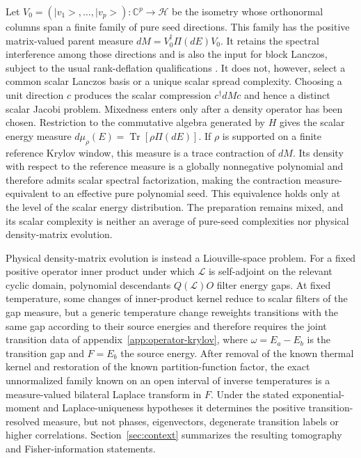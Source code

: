\documentclass[a4paper,11pt]{article}
\def\ket#1{|#1>}%
\def\dd{d}%
\theoremstyle{definition}
\theoremstyle{remark}
\newcommand{\ket}[1]{|#1\rangle}
\newcommand{\dd}{\mathrm d}
\newcommand{\CC}{\mathbb C}
\begin{document}
Let
$V_0=(\ket{v_1},\ldots,\ket{v_p}):\CC^p\to\mathcal H$ be the isometry whose orthonormal columns
span a finite family of pure seed directions.  This family has the positive matrix-valued parent
measure $\dd M=V_0^\dagger\Pi(\dd E)V_0$.  It retains the spectral
interference among those directions and is also the input for block Lanczos, subject to the usual
rank-deflation qualifications \cite{CrapsEvninPascuzzi2024}.  It does not, however, select a
common scalar Lanczos basis or a unique scalar spread complexity.  Choosing a unit direction $c$
produces the scalar compression $c^\dagger\dd M c$ and hence a distinct scalar Jacobi problem.
Mixedness enters only after a density operator has been chosen.  Restriction to the commutative
algebra generated by $H$ gives the scalar energy measure
$\dd\mu_\rho(E)=\operatorname{Tr}[\rho\Pi(\dd E)]$.  If $\rho$ is supported on a finite reference
Krylov window, this measure is a trace contraction of $\dd M$.  Its density with respect to
the reference measure is a globally nonnegative polynomial and therefore admits scalar spectral factorization, making the contraction
measure-equivalent to an effective pure polynomial seed.  This equivalence holds only at the level
of the scalar energy distribution.  The preparation remains mixed, and its scalar complexity is
neither an average of pure-seed complexities nor physical density-matrix evolution.

Physical density-matrix evolution is instead a Liouville-space problem.  For a fixed positive
operator inner product under which $\mathcal L$ is self-adjoint on the relevant cyclic domain,
polynomial descendants $Q(\mathcal L)O$ filter energy gaps.  At fixed
temperature, some changes of inner-product kernel reduce to scalar filters of the gap measure, but
a generic temperature change reweights transitions with the same gap according to their source
energies and therefore requires the joint transition data of
appendix~\ref{app:operator-krylov}, where $\omega=E_a-E_b$ is the transition gap and $F=E_b$ the source energy.  After removal of the known thermal kernel and restoration of
the known partition-function factor, the exact unnormalized family known on an open interval of inverse temperatures is a measure-valued bilateral Laplace transform in $F$.  Under the stated
exponential-moment and Laplace-uniqueness hypotheses it determines the positive transition-resolved measure, but not phases,
eigenvectors, degenerate transition labels or higher correlations.   Section~\ref{sec:context}
summarizes the resulting tomography and Fisher-information statements.
\end{document}
